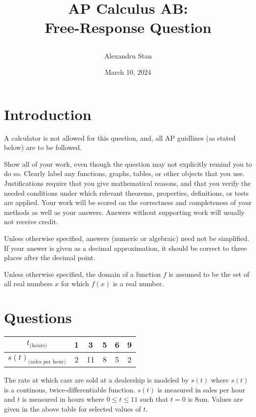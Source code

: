 \documentclass{article}
\title{
    \textbf{AP Calculus AB: \\Free-Response Question}
    \author{Alexandru Stan}
    \date{March 10, 2024}
}
\begin{document}
    \maketitle
    \vfill
    \newpage

    \section*{Introduction}

    A calculator is not allowed for this question, and, all AP guidlines (as stated below) 
    are to be followed. 

    Show all of your work, even though the question may not explicitly remind you to do so. Clearly label any
    functions, graphs, tables, or other objects that you use. Justifications require that you give mathematical reasons,
    and that you verify the needed conditions under which relevant theorems, properties, definitions, or tests are
    applied. Your work will be scored on the correctness and completeness of your methods as well as your answers.
    Answers without supporting work will usually not receive credit.

    Unless otherwise specified, answers (numeric or algebraic) need not be simplified. If your answer is given as a
    decimal approximation, it should be correct to three places after the decimal point.

    Unless otherwise specified, the domain of a function $f$ is assumed to be the set of all real numbers $x$ for which
    $f(x)$ is a real number.

    \section*{Questions}

    \begin{table}[h]
        \def\arraystretch{2}
        \begin{tabular}{|c|c|c|c|c|c|}
            \hline
            $t_{\text{(hours)}}$ & 1 & 3 & 5 & 6 & 9 \\
            \hline
            $s(t)_{\text{(sales per hour)}}$ & 2 & 11 & 8 & 5 & 2 \\
            \hline 
        \end{tabular}
    \end{table} 

    The rate at which cars are sold at a dealership is modeled by $s(t)$ where $s(t)$ is a continous, twice-differentiable function.
    $s(t)$ is measured in sales per hour and $t$ is measured in hours where $0 \le t \le 11$ such that
    $t = 0$ is 8am. Values are given in the above table for selected values of $t$.
\end{document}
